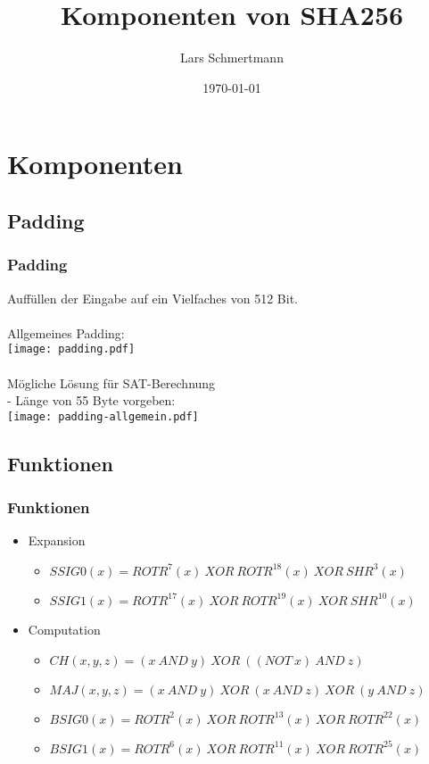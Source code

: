 \documentclass{beamer}
\title{Komponenten von SHA256}
\author{Lars Schmertmann}
\date{\today}
\begin{document}
\maketitle
\frame{\tableofcontents[currentsection]}
 
\section{Komponenten}
\subsection{Padding}
  \begin{frame}
    \frametitle{Padding}
    Auffüllen der Eingabe auf ein Vielfaches von 512 Bit.\\
    ~\\
    Allgemeines Padding:\\
    \texttt{[image: padding.pdf]}\\
    \pause~\\
    Mögliche Lösung für SAT-Berechnung\\
    - Länge von 55 Byte vorgeben:\\
    \texttt{[image: padding-allgemein.pdf]}
  \end{frame}
\subsection{Funktionen}
  \begin{frame}
    \frametitle{Funktionen}
    \begin{itemize}
      \setlength{\itemsep}{20pt}
      \item Expansion
        \begin{itemize}
          \setlength{\itemsep}{10pt}
          \item $ SSIG0(x) = ROTR^{7}(x)~XOR~ROTR^{18}(x)~XOR~SHR^{3}(x) $
          \item $ SSIG1(x) = ROTR^{17}(x)~XOR~ROTR^{19}(x)~XOR~SHR^{10}(x) $
        \end{itemize}
      \item Computation
        \begin{itemize}
          \setlength{\itemsep}{10pt}
          \item $ CH( x, y, z) = (x~AND~y)~XOR~( (NOT~x)~AND~z) $
          \item $ MAJ( x, y, z) = (x~AND~y)~XOR~(x~AND~z)~XOR~(y~AND~z) $
          \item $ BSIG0(x) = ROTR^{2}(x)~XOR~ROTR^{13}(x)~XOR~ROTR^{22}(x) $
          \item $ BSIG1(x) = ROTR^{6}(x)~XOR~ROTR^{11}(x)~XOR~ROTR^{25}(x) $
        \end{itemize}
    \end{itemize}
  \end{frame}
\end{document}
